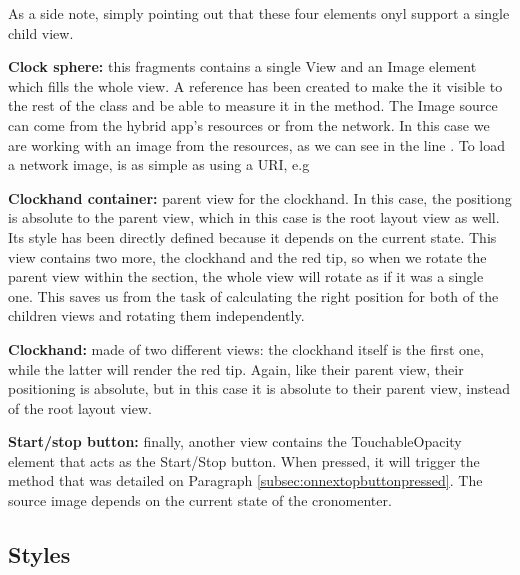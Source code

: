 \begin{description}
 As a side note, simply pointing out that these four elements onyl support a single child view.
  
 \item \textbf{Clock sphere:} this fragments contains a single View and an Image element which fills the whole view. A reference has been created to make the it visible to the rest of the class and be able to measure it in the  method. The Image source can come from the hybrid app's resources or from the network. In this case we are working with an image from the resources, as we can see in the line . To load a network image, is as simple as using a URI, e.g 
 
 \item \textbf{Clockhand container:} parent view for the clockhand. In this case, the positiong is absolute to the parent view, which in this case is the root layout view as well. Its style has been directly defined because it depends on the current state. This view contains two more, the clockhand and the red tip, so when we rotate the parent view within the  section, the whole view will rotate as if it was a single one. This saves us from the task of calculating the right position for both of the children views and rotating them independently.
 \item \textbf{Clockhand:} made of two different views: the clockhand itself is the first one, while the latter will render the red tip. Again, like their parent view, their positioning is absolute, but in this case it is absolute to their parent view, instead of the root layout view.
 \item \textbf{Start/stop button:} finally, another view contains the TouchableOpacity element that acts as the Start/Stop button. When pressed, it will trigger the  method that was detailed on Paragraph \ref{subsec:onnextopbuttonpressed}. The source image depends on the current state of the cronomenter.
\end{description}

\subsection{Styles}
\label{subsec:styles}

\begingroup
\lstset{style=myhtml,linewidth=7cm}
\captionsetup{labelformat=empty,labelsep=none}

\endgroup
\begingroup
{}
\endgroup

